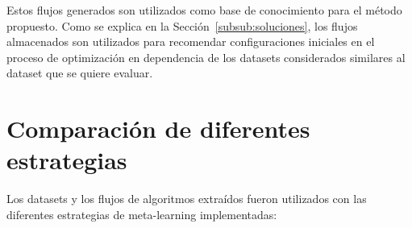 Estos flujos generados son utilizados como base de conocimiento para el método propuesto. Como se explica en la Sección~\ref{subsub:soluciones}, los flujos almacenados son utilizados para recomendar configuraciones iniciales en el proceso de optimización en dependencia de los datasets considerados similares al dataset que se quiere evaluar.

\section{Comparación de diferentes estrategias}\label{sec:comparacion}

%

Los datasets y los flujos de algoritmos extraídos fueron utilizados con las diferentes estrategias de meta-learning implementadas:

